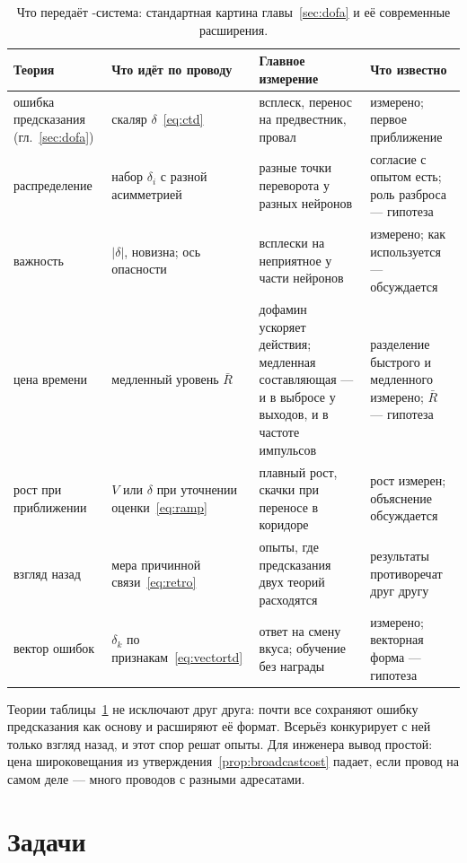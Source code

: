 \begin{table}[t]
\centering
\footnotesize
\setlength{\tabcolsep}{4pt}
\renewcommand{\arraystretch}{1.15}
\begin{tabular}{>{\raggedright}p{2.5cm}>{\raggedright}p{3.2cm}>{\raggedright}p{3.6cm}>{\raggedright\arraybackslash}p{4.2cm}}
\toprule
Теория & Что идёт по проводу & Главное измерение & Что известно \\
\midrule
ошибка предсказания (гл.~\ref{sec:dofa}) & скаляр $\delta$~\eqref{eq:ctd} & всплеск, перенос на предвестник, провал & измерено; первое приближение \\
распределение & набор $\delta_i$ с разной асимметрией & разные точки переворота у разных нейронов & согласие с опытом есть; роль разброса --- гипотеза \\
важность & $|\delta|$, новизна; ось опасности & всплески на неприятное у части нейронов & измерено; как используется --- обсуждается \\
цена времени & медленный уровень $\bar R$ & дофамин ускоряет действия; медленная составляющая --- и в выбросе у выходов, и в частоте импульсов & разделение быстрого и медленного измерено; $\bar R$ --- гипотеза \\
рост при приближении & $V$ или $\delta$ при уточнении оценки~\eqref{eq:ramp} & плавный рост, скачки при переносе в коридоре & рост измерен; объяснение обсуждается \\
взгляд назад & мера причинной связи~\eqref{eq:retro} & опыты, где предсказания двух теорий расходятся & результаты противоречат друг другу \\
вектор ошибок & $\delta_k$ по признакам~\eqref{eq:vectortd} & ответ на смену вкуса; обучение без награды & измерено; векторная форма --- гипотеза \\
\bottomrule
\end{tabular}
\caption{Что передаёт -система: стандартная картина главы~\ref{sec:dofa} и её современные расширения.}
\label{tab:dofaalt}
\end{table}

Теории таблицы~\ref{tab:dofaalt} не исключают друг друга: почти все сохраняют ошибку предсказания как основу и расширяют её формат. Всерьёз конкурирует с ней только взгляд назад, и этот спор решат опыты. Для инженера вывод простой: цена широковещания из утверждения~\ref{prop:broadcastcost} падает, если провод на самом деле --- много проводов с разными адресатами.

\section{Задачи}

